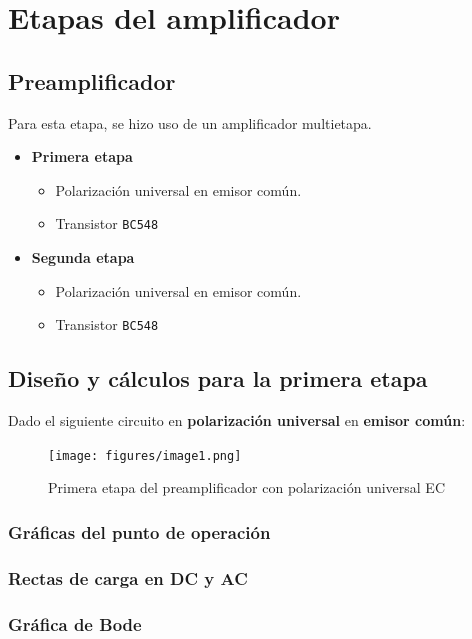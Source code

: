\documentclass[a4paper, 12pt]{article}
\begin{document}
\section{Etapas del amplificador}

\subsection{Preamplificador}
Para esta etapa, se hizo uso de un amplificador multietapa.
\begin{itemize}
    \item \textbf{Primera etapa}
        \begin{itemize}
            \item Polarización universal en emisor común.
            \item Transistor \verb|BC548|
        \end{itemize}

    \item \textbf{Segunda etapa}
        \begin{itemize}
            \item Polarización universal en emisor común.
            \item Transistor \verb|BC548|
        \end{itemize}
\end{itemize}

\subsection{Diseño y cálculos para la primera etapa}
Dado el siguiente circuito en \textbf{polarización universal} en \textbf{emisor común}:  
\begin{figure}[H]
    \centering
    \texttt{[image: figures/image1.png]}
    \caption{Primera etapa del preamplificador con polarización universal EC}
    \label{fig:image1}
\end{figure}
\subsubsection{Gráficas del punto de operación}
\subsubsection{Rectas de carga en DC y AC}
\subsubsection{Gráfica de Bode}
\end{document}
